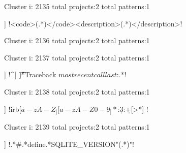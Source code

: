 Cluster i: 2135
total projects:2
total patterns:1
\begin{multicols}{1}
\begin{description}[noitemsep,topsep=0pt]
\item [[2] ] \cverb!<code>(.*)</code><description>(.*)</description>!
\end{description}
\end{multicols}







Cluster i: 2136
total projects:2
total patterns:1
\begin{multicols}{1}
\end{multicols}







Cluster i: 2137
total projects:2
total patterns:1
\begin{multicols}{1}
\begin{description}[noitemsep,topsep=0pt]
\item [[2] ] \cverb!^[ \t]*Traceback \(most recent call last\):.*!
\end{description}
\end{multicols}







Cluster i: 2138
total projects:2
total patterns:1
\begin{multicols}{1}
\begin{description}[noitemsep,topsep=0pt]
\item [[2] ] \cverb!irb\([a-zA-Z_][a-zA-Z0-9_]*\):\d{3}:\d+[>*] !
\end{description}
\end{multicols}







Cluster i: 2139
total projects:2
total patterns:1
\begin{multicols}{1}
\begin{description}[noitemsep,topsep=0pt]
\item [[2] ] \cverb!\s*.*#\s*.*define\s.*SQLITE_VERSION\W*"(.*)"!
\end{description}
\end{multicols}







